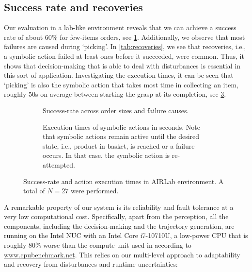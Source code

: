 \subsection{Success rate and recoveries}

Our evaluation in a lab-like environment reveals that we can
achieve a success rate of about 60\% for few-items orders,
see \cref{fig:success_lab}. Additionally, we observe that
most failures are caused during `picking'.
In \cref{tab:recoveries}, we see that recoveries, i.e., a
symbolic action failed at least ones before it succeeded, were common. Thus, it shows that decision-making that is able to deal with disturbances is essential in this sort of application.
Investigating the 
execution times, it can be seen that `picking' is also the
symbolic action
that takes most time in collecting an item, roughly $50$s on average between starting the grasp at its completion, 
see \cref{fig:timings_lab}.
\begin{figure}
\begin{subfigure}[b]{1\linewidth}
    \centering
    
    \caption{Success-rate across order sizes and failure causes.}
    \label{fig:success_lab}
  \end{subfigure}
\begin{subfigure}[b]{1\linewidth}
    \centering%
     
    \caption{Execution times of symbolic actions in seconds. Note
    that symbolic actions remain active until the desired state,
    i.e., product in basket, is reached or a failure occurs.
    In that case, the symbolic action is re-attempted.}
    \label{fig:timings_lab}
  \end{subfigure}
  \caption{Success-rate and action execution times in AIRLab
  environment. A total of $N=27$ were performed.}
\end{figure}

A remarkable property of our system is its reliability and
fault tolerance at a very low computational cost.
Specifically, apart from the perception, all the components,
including the decision-making and the trajectory generation,
are running on the Intel NUC with an Intel Core i7-10710U, a
low-power CPU that is roughly 80\% worse than the compute
unit used in \cite{toyota2023} according to \url{www.cpubenchmark.net}.
This
relies on our multi-level approach to adaptability and
recovery from disturbances and runtime uncertainties:
